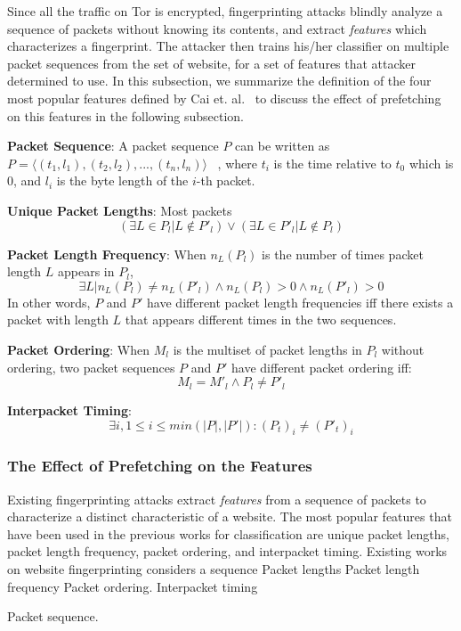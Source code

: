 Since all the traffic on Tor is encrypted, fingerprinting attacks blindly analyze a sequence of packets without knowing its contents, and extract {\it features} which characterizes a fingerprint.
The attacker then trains his/her classifier on multiple packet sequences from the set of website, for a set of features that attacker determined to use.
In this subsection, we summarize the definition of the four most popular features defined by Cai et. al.~\cite{Cai:2014kjb} to discuss the effect of prefetching on this features in the following subsection.

{\bf Packet Sequence}:
A packet sequence $P$ can be written as $P = \langle(t_1, l_1), (t_2, l_2), ..., (t_n, l_n)\rangle$ ~\cite{Cai:2014kjb}, where $t_i$ is the time relative to $t_0$ which is 0, and $l_i$ is the byte length of the $i$-th packet.

{\bf Unique Packet Lengths}: 
Most packets 
\begin{equation}
(\exists L \in P_l | L \notin P'_l ) \vee (\exists L \in P'_l | L \notin P_l)
\end{equation}

{\bf Packet Length Frequency}:
When $n_L(P_l)$ is the number of times packet length $L$ appears in $P_l$,
\begin{equation}
\exists L|n_L(P_l) \neq n_L(P'_l) \wedge n_L(P_l)>0 \wedge n_L(P'_l) >0
\end{equation}
In other words, $P$ and $P'$ have different packet length frequencies iff there exists a packet with length $L$ that appears different times in the two sequences.

{\bf Packet Ordering}:
When $M_l$ is the multiset of packet lengths in $P_l$ without ordering, two packet sequences $P$ and $P'$ have different packet ordering iff:
\begin{equation}
M_{ l }=M'_{ l }\wedge P_{ l }\neq P'_{ l }
\end{equation}

{\bf Interpacket Timing}:
\begin{equation}
\exists i, 1 \le i \le \mathit{min}(|P|, |P'|) : (P_t)_i \neq (P'_t)_i
\end{equation}


\subsubsection{The Effect of Prefetching on the Features}

Existing fingerprinting attacks extract {\it features} from a sequence of packets to characterize a distinct characteristic of a website.
The most popular features that have been used in the previous works for classification are unique packet lengths, packet length frequency, packet ordering, and interpacket timing.
Existing works on website fingerprinting considers a sequence
Packet lengths
Packet length frequency
Packet ordering.
Interpacket timing

Packet sequence.
